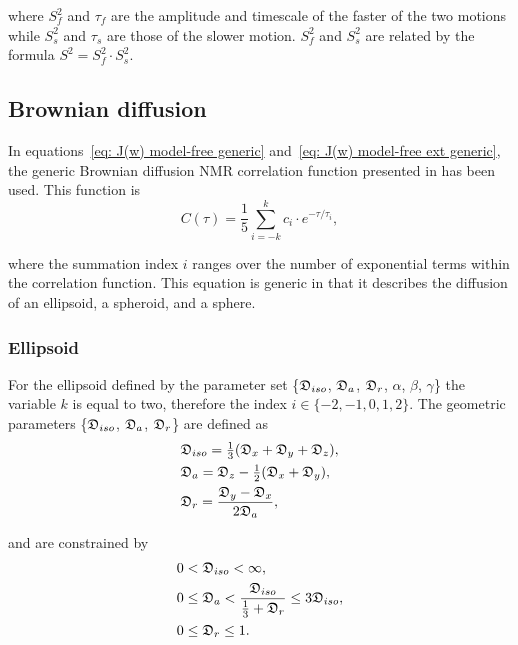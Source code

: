 \noindent where $S^2_f$ and $\tau_f$ are the amplitude and timescale of the faster of the two motions while $S^2_s$ and $\tau_s$ are those of the slower motion.  $S^2_f$ and $S^2_s$ are related by the formula $S^2 = S^2_f \cdot S^2_s$.



\subsection{Brownian diffusion}

In equations~\eqref{eq: J(w) model-free generic} and~\eqref{eq: J(w) model-free ext generic}, the generic Brownian diffusion NMR correlation function presented in \citet{dAuvergneGooley06b} has been used.  This function is
\begin{equation} \label{eq: C(tau) generic}
 C(\tau) = \frac{1}{5} \sum_{i=-k}^k c_i \cdot e^{-\tau/\tau_i},
\end{equation}

\noindent where the summation index $i$ ranges over the number of exponential terms within the correlation function.  This equation is generic in that it describes the diffusion of an ellipsoid, a spheroid, and a sphere.


\subsubsection{Ellipsoid}
For the ellipsoid defined by the parameter set \{$\mathfrak{D}_{iso}$, $\mathfrak{D}_a$, $\mathfrak{D}_r$, $\alpha$, $\beta$, $\gamma$\} the variable $k$ is equal to two, therefore the index $i \in \{-2, -1, 0, 1, 2\}$.  The geometric parameters \{$\mathfrak{D}_{iso}$, $\mathfrak{D}_a$, $\mathfrak{D}_r$\} are defined as
\begin{subequations}
\begin{align}
 & \mathfrak{D}_{iso} = \tfrac{1}{3} (\mathfrak{D}_x + \mathfrak{D}_y + \mathfrak{D}_z ),   \label{eq: Diso ellipsoid def} \\
 & \mathfrak{D}_a = \mathfrak{D}_z - \tfrac{1}{2}(\mathfrak{D}_x + \mathfrak{D}_y),         \label{eq: Da ellipsoid def} \\
 & \mathfrak{D}_r = \frac{\mathfrak{D}_y - \mathfrak{D}_x}{2\mathfrak{D}_a},                \label{eq: Dr ellipsoid def}
\end{align}
\end{subequations}

\noindent and are constrained by
\begin{subequations}
\begin{align}
 0 & < \mathfrak{D}_{iso} < \infty,                                                    \label{eq: Diso lim} \\
 0 & \le \mathfrak{D}_a < \frac{\mathfrak{D}_{iso}}{\tfrac{1}{3} + \mathfrak{D}_r} \le 3\mathfrak{D}_{iso}, \label{eq: Da lim} \\
 0 & \le \mathfrak{D}_r \le 1.                                                         \label{eq: Dr lim}
\end{align}
\end{subequations}


